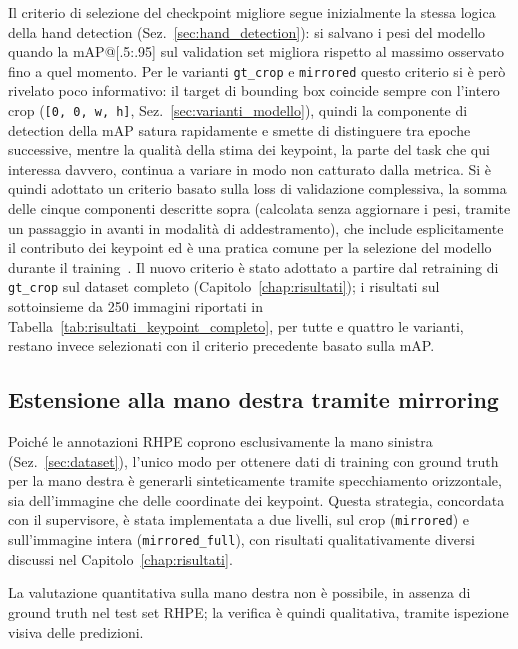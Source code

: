 Il criterio di selezione del checkpoint migliore segue inizialmente la
stessa logica della hand detection (Sez.~\ref{sec:hand_detection}): si
salvano i pesi del modello quando la mAP@[.5:.95] sul validation set
migliora rispetto al massimo osservato fino a quel momento. Per le
varianti \texttt{gt\_crop} e \texttt{mirrored} questo criterio si è però
rivelato poco informativo: il target di bounding box coincide sempre con
l'intero crop (\texttt{[0, 0, w, h]}, Sez.~\ref{sec:varianti_modello}),
quindi la componente di detection della mAP satura rapidamente e smette
di distinguere tra epoche successive, mentre la qualità della stima dei
keypoint, la parte del task che qui interessa davvero, continua a
variare in modo non catturato dalla metrica. Si è quindi adottato un
criterio basato sulla loss di validazione complessiva, la somma delle
cinque componenti descritte sopra (calcolata senza aggiornare i pesi,
tramite un passaggio in avanti in modalità di addestramento), che
include esplicitamente il contributo dei keypoint ed è una pratica
comune per la selezione del modello durante il
training~\cite{goodfellow2016deep}. Il nuovo criterio è stato adottato a
partire dal retraining di \texttt{gt\_crop} sul dataset completo
(Capitolo~\ref{chap:risultati}); i risultati sul sottoinsieme da 250
immagini riportati in Tabella~\ref{tab:risultati_keypoint_completo}, per
tutte e quattro le varianti, restano invece selezionati con il criterio
precedente basato sulla mAP.

\subsection{Estensione alla mano destra tramite mirroring}
\label{sec:mirroring}

Poiché le annotazioni RHPE coprono esclusivamente la mano sinistra
(Sez.~\ref{sec:dataset}), l'unico modo per ottenere dati di training con
ground truth per la mano destra è generarli sinteticamente tramite
specchiamento orizzontale, sia dell'immagine che delle coordinate dei
keypoint. Questa strategia, concordata con il supervisore, è stata
implementata a due livelli, sul crop (\texttt{mirrored}) e
sull'immagine intera (\texttt{mirrored\_full}), con risultati
qualitativamente diversi discussi nel Capitolo~\ref{chap:risultati}.

La valutazione quantitativa sulla mano destra non è possibile, in
assenza di ground truth nel test set RHPE; la verifica è quindi
qualitativa, tramite ispezione visiva delle predizioni.

